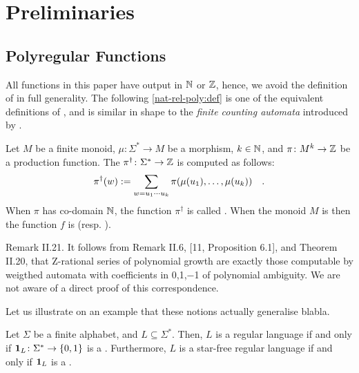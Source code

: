 \section{Preliminaries}
\label{preliminaries:sec}

\subsection{Polyregular Functions}

All functions in this paper have output in $\mathbb{N}$ or $\mathbb{Z}$,
hence, we avoid the definition of 
in full generality. The following \cref{nat-rel-poly:def}
is one of the equivalent definitions of \cite{LOPEZ23b},
and is similar in shape to the \emph{finite counting automata}
introduced by \textcite{schutzenberger1962}.

\begin{definition}
    \label{nat-rel-poly:def}
    Let $M$ be a finite monoid, $\mu \colon \Sigma^* \to M$
    be a morphism, $k \in \mathbb{N}$, and 
    $\pi \colon M^k \to \mathbb{Z}$ be a production function.
    The 
    $\pi^\dagger \colon \Sigma^* \to \mathbb{Z}$
    is computed as follows:
    \begin{equation*}
        \pi^\dagger (w) \mathrel{:=}
        \sum_{w = u_1 \cdots u_k} \pi(\mu(u_1), \dots, \mu(u_k))
        \quad .
    \end{equation*}
    When $\pi$ has co-domain $\mathbb{N}$, the function $\pi^\dagger$
    is called .
    When the monoid $M$ is 
    then
    the function $f$ is 
    (resp. ).
\end{definition}

Remark II.21. It follows from Remark II.6, [11, Proposition 6.1], and Theorem
II.20, that Z-rational series of polynomial growth are exactly those computable
by weigthed automata with coefficients in {0,1,−1} of polynomial ambiguity. We
are not aware of a direct proof of this correspondence.


Let us illustrate on an example that these notions actually generalise
blabla.

\begin{example}
    \label{regular-language:ex}
    Let $\Sigma$ be a finite alphabet, and
    $L \subseteq \Sigma^*$. Then,
    $L$ is a regular language if and only if
    $\mathbf{1}_{L} \colon \Sigma^* \to \mathopen{\{} 0,1 \mathclose{\}}$ is a
    .
    Furthermore, $L$ is a star-free regular language
    if and only if $\mathbf{1}_{L}$ is a
    .
\end{example}



